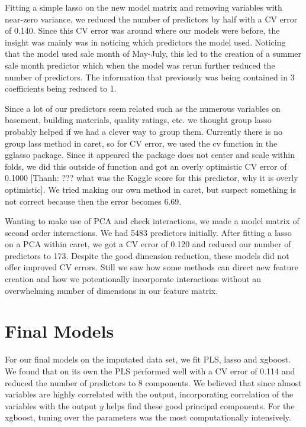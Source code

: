 \documentclass[12pt]{article}
\newcommand{\thanh}[1]{{\color{blue} [Thanh: #1]}}
\begin{document}
Fitting a simple lasso on the new model matrix and removing variables with near-zero variance, we reduced the number of predictors by half with a CV error of 0.140.  Since this CV error was around where our models were before, the insight was mainly was in noticing which predictors the model used. Noticing that the model used sale month of May-July, this led to the creation of a summer sale month predictor which when the model was rerun further reduced the number of predictors.  The information that previously was being contained in 3 coefficients being reduced to 1.

Since a lot of our predictors seem related such as the numerous variables on basement, building materials, quality ratings, etc. we thought group lasso probably helped if we had a clever way to group them. Currently there is no group lass method in caret, so for CV error, we used the cv function in the gglasso package.  Since it appeared the package does not center and scale within folds, we did this outside of function and got an overly optimistic CV error of 0.1000 \thanh{??? what was the Kaggle score for this predictor, why it is overly optimistic}. We tried making our own method in caret, but suspect something is not correct because then the error becomes 6.69.

Wanting to make use of PCA and check interactions, we made a model matrix of second order interactions. We had 5483 predictors initially. After fitting a lasso on a PCA within caret, we got a CV error of 0.120 and reduced our number of predictors to 173. Despite the good dimension reduction, these models did not offer improved CV errors.  Still we saw how some methods can direct new feature creation and how we potentionally incorporate interactions without an overwhelming number of dimensions in our feature matrix.

\section{Final Models}

For our final models on the imputated data set, we fit PLS, lasso and xgboost. %
We found that on its own the PLS performed well with a CV error of 0.114 and reduced the number of predictors to 8 components. We believed that since almost variables are highly correlated with the output, incorporating correlation of the variables with the output $y$ helps find these good principal components. For the xgboost, tuning over the parameters was the most computationally intensively.
\end{document}
